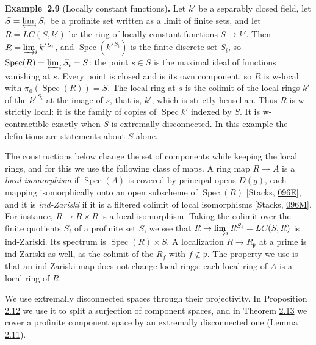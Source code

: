 \documentclass[11pt]{article}
\newenvironment{bpstatement}[2]{\par\addvspace{0.6\baselineskip}\noindent\textbf{#1}#2\textbf{.}\enspace\ignorespaces}
  {\par\addvspace{0.4\baselineskip}}
\begin{document}
\label{bp28}%
\begin{bpstatement}{Example~2.9}{ (Locally constant functions)}
Let \(k'\) be a separably closed field, let \(S=\varprojlim_iS_i\) be a profinite set written as a limit of finite sets, and let \(R=LC(S,k')\) be the ring of locally constant functions \(S\to k'\). Then \(R=\varinjlim_ik'^{\,S_i}\), and \(\operatorname{Spec}(k'^{\,S_i})\) is the finite discrete set \(S_i\), so \(\operatorname{Spec}(R)=\varprojlim_iS_i=S\): the point \(s\in S\) is the maximal ideal of functions vanishing at \(s\). Every point is closed and is its own component, so \(R\) is w-local with \(\pi_0(\operatorname{Spec}(R))=S\). The local ring at \(s\) is the colimit of the local rings \(k'\) of the \(k'^{\,S_i}\) at the image of \(s\), that is, \(k'\), which is strictly henselian. Thus \(R\) is w-strictly local: it is the family of copies of \(\operatorname{Spec}k'\) indexed by \(S\). It is w-contractible exactly when \(S\) is extremally disconnected. In this example the definitions are statements about \(S\) alone.
\end{bpstatement}

\label{bp29}%
The constructions below change the set of components while keeping the local rings, and for this we use the following class of maps. A ring map \(R\to A\) is a \emph{local isomorphism} if \(\operatorname{Spec}(A)\) is covered by principal opens \(D(g)\), each mapping isomorphically onto an open subscheme of \(\operatorname{Spec}(R)\) [Stacks, \href{https://stacks.math.columbia.edu/tag/096E}{096E}], and it is \emph{ind-Zariski} if it is a filtered colimit of local isomorphisms [Stacks, \href{https://stacks.math.columbia.edu/tag/096M}{096M}]. For instance, \(R\to R\times R\) is a local isomorphism. Taking the colimit over the finite quotients \(S_i\) of a profinite set \(S\), we see that \(R\to\varinjlim_iR^{S_i}=LC(S,R)\) is ind-Zariski. Its spectrum is \(\operatorname{Spec}(R)\times S\). A localization \(R\to R_{\mathfrak p}\) at a prime is ind-Zariski as well, as the colimit of the \(R_f\) with \(f\notin\mathfrak p\). The property we use is that an ind-Zariski map does not change local rings: each local ring of \(A\) is a local ring of \(R\).

We use extremally disconnected spaces through their projectivity. In Proposition \hyperref[bp36]{2.12} we use it to split a surjection of component spaces, and in Theorem \hyperref[bp39]{2.13} we cover a profinite component space by an extremally disconnected one (Lemma \hyperref[bp33]{2.11}).
\end{document}
